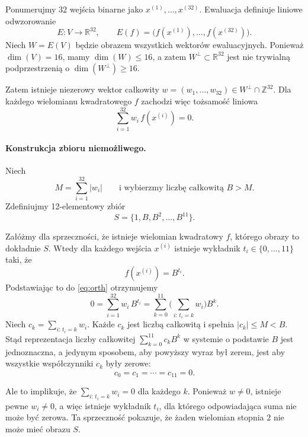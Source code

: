 Ponumerujmy $32$ wejścia binarne jako $x^{(1)},\dots,x^{(32)}$.  
Ewaluacja definiuje liniowe odwzorowanie
\[
E : V \longrightarrow \mathbb{R}^{32}, \qquad 
E(f) = \big(f(x^{(1)}),\dots,f(x^{(32)})\big).
\]
Niech $W = E(V)$ będzie obrazem wszystkich wektorów ewaluacyjnych.  
Ponieważ $\dim(V)=16$, mamy $\dim(W)\le 16$, a zatem
$W^\perp \subset \mathbb{R}^{32}$ jest nie trywialną podprzestrzenią o
$\dim(W^\perp)\ge 16$.

Zatem istnieje niezerowy wektor całkowity 
$w=(w_1,\dots,w_{32}) \in W^\perp \cap \mathbb{Z}^{32}$.  
Dla każdego wielomianu kwadratowego $f$ zachodzi więc tożsamość liniowa
\begin{equation}
\sum_{i=1}^{32} w_i\, f(x^{(i)}) = 0.
\label{eq:orth}
\end{equation}

\paragraph{Konstrukcja zbioru niemożliwego.}
Niech 
\[
M = \sum_{i=1}^{32} |w_i|
\qquad\text{i wybierzmy liczbę całkowitą } B > M.
\]
Zdefiniujmy 12-elementowy zbiór
\[
S = \{1, B, B^2, \dots, B^{11}\}.
\]

Załóżmy dla sprzeczności, że istnieje wielomian kwadratowy $f$, którego
obrazy to dokładnie $S$.  
Wtedy dla każdego wejścia $x^{(i)}$ istnieje wykładnik $t_i\in\{0,\dots,11\}$ taki, że
\begin{equation}
f(x^{(i)}) = B^{t_i}.
\end{equation}
Podstawiając to do \eqref{eq:orth} otrzymujemy
\begin{equation}
0=\sum_{i=1}^{32} w_i\, B^{t_i}
   = \sum_{k=0}^{11} 
      \Big( \sum_{i:\, t_i=k} w_i \Big) B^k.
\end{equation}
Niech $c_k=\sum_{i:\,t_i=k} w_i$.  
Każde $c_k$ jest liczbą całkowitą i spełnia $|c_k|\le M < B$.  
Stąd reprezentacja liczby całkowitej $\sum_{k=0}^{11} c_k B^k$ w systemie
o podstawie $B$ jest jednoznaczna, a jedynym sposobem, aby powyższy
wyraz był zerem, jest aby wszystkie współczynniki $c_k$ były zerowe:
\begin{equation}
c_0 = c_1 = \cdots = c_{11} = 0.
\end{equation}

Ale to implikuje, że $\sum_{i:\,t_i=k} w_i = 0$ dla każdego $k$.  
Ponieważ $w\neq 0$, istnieje pewne $w_i \neq 0$, a więc istnieje wykładnik
$t_i$, dla którego odpowiadająca suma nie może być zerowa.  
Ta sprzeczność pokazuje, że żaden wielomian stopnia $2$ nie może mieć obrazu $S$.

